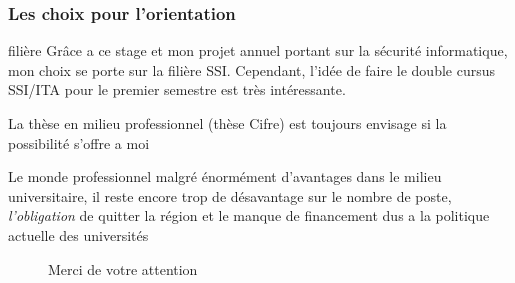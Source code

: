 \documentclass{beamer}
\begin{document}
  \begin{frame}
    \frametitle{Les choix pour l'orientation}

    \begin{block}{filière}  
      Grâce a ce stage et mon projet annuel portant sur la sécurité informatique, mon choix se porte sur la filière SSI. Cependant, l’idée de faire le double cursus SSI/ITA pour le premier semestre est très intéressante. 

      La thèse en milieu professionnel (thèse Cifre) est toujours envisage si la possibilité s'offre a moi
    \end{block}
    \pause
    \begin{block}{Le monde professionnel}  
      malgré énormément d'avantages dans le milieu universitaire, il reste encore trop de désavantage sur le nombre de poste, \textit{l'obligation} de quitter la région et le manque de financement dus a la politique actuelle des universités
    \end{block}
  \end{frame}

  \begin{frame}
    \begin{figure}
      \centering
      Merci de votre attention
    \end{figure}
  \end{frame}
  
\end{document}
